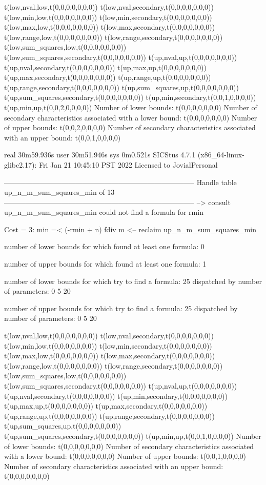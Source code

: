 t(low,nval,low,t(0,0,0,0,0,0,0))
t(low,nval,secondary,t(0,0,0,0,0,0,0))
t(low,min,low,t(0,0,0,0,0,0,0))
t(low,min,secondary,t(0,0,0,0,0,0,0))
t(low,max,low,t(0,0,0,0,0,0,0))
t(low,max,secondary,t(0,0,0,0,0,0,0))
t(low,range,low,t(0,0,0,0,0,0,0))
t(low,range,secondary,t(0,0,0,0,0,0,0))
t(low,sum_squares,low,t(0,0,0,0,0,0,0))
t(low,sum_squares,secondary,t(0,0,0,0,0,0,0))
t(up,nval,up,t(0,0,0,0,0,0,0))
t(up,nval,secondary,t(0,0,0,0,0,0,0))
t(up,max,up,t(0,0,0,0,0,0,0))
t(up,max,secondary,t(0,0,0,0,0,0,0))
t(up,range,up,t(0,0,0,0,0,0,0))
t(up,range,secondary,t(0,0,0,0,0,0,0))
t(up,sum_squares,up,t(0,0,0,0,0,0,0))
t(up,sum_squares,secondary,t(0,0,0,0,0,0,0))
t(up,min,secondary,t(0,0,1,0,0,0,0))
t(up,min,up,t(0,0,2,0,0,0,0))
Number of lower bounds:                                             t(0,0,0,0,0,0,0)
Number of secondary characteristics associated with a lower bound:  t(0,0,0,0,0,0,0)
Number of upper bounds:                                             t(0,0,2,0,0,0,0)
Number of secondary characteristics associated with an upper bound: t(0,0,1,0,0,0,0)

real	30m59.936s
user	30m51.946s
sys	0m0.521s
SICStus 4.7.1 (x86_64-linux-glibc2.17): Fri Jan 21 10:45:10 PST 2022
Licensed to JovialPersonal


--------------------------------------------------------------------------------
Handle table up_n_m_sum_squares_min of 13
--------------------------------------------------------------------------------
--> consult up_n_m_sum_squares_min
could not find a formula for rmin

Cost =  3:  min =< (-rmin + n) fdiv m
<-- reclaim up_n_m_sum_squares_min

number of lower bounds for which found at least one formula: 0

number of upper bounds for which found at least one formula: 1

number of lower bounds for which try to find a formula: 25
dispatched by number of parameters: 0  5  20

number of upper bounds for which try to find a formula: 25
dispatched by number of parameters: 0  5  20

t(low,nval,low,t(0,0,0,0,0,0,0))
t(low,nval,secondary,t(0,0,0,0,0,0,0))
t(low,min,low,t(0,0,0,0,0,0,0))
t(low,min,secondary,t(0,0,0,0,0,0,0))
t(low,max,low,t(0,0,0,0,0,0,0))
t(low,max,secondary,t(0,0,0,0,0,0,0))
t(low,range,low,t(0,0,0,0,0,0,0))
t(low,range,secondary,t(0,0,0,0,0,0,0))
t(low,sum_squares,low,t(0,0,0,0,0,0,0))
t(low,sum_squares,secondary,t(0,0,0,0,0,0,0))
t(up,nval,up,t(0,0,0,0,0,0,0))
t(up,nval,secondary,t(0,0,0,0,0,0,0))
t(up,min,secondary,t(0,0,0,0,0,0,0))
t(up,max,up,t(0,0,0,0,0,0,0))
t(up,max,secondary,t(0,0,0,0,0,0,0))
t(up,range,up,t(0,0,0,0,0,0,0))
t(up,range,secondary,t(0,0,0,0,0,0,0))
t(up,sum_squares,up,t(0,0,0,0,0,0,0))
t(up,sum_squares,secondary,t(0,0,0,0,0,0,0))
t(up,min,up,t(0,0,1,0,0,0,0))
Number of lower bounds:                                             t(0,0,0,0,0,0,0)
Number of secondary characteristics associated with a lower bound:  t(0,0,0,0,0,0,0)
Number of upper bounds:                                             t(0,0,1,0,0,0,0)
Number of secondary characteristics associated with an upper bound: t(0,0,0,0,0,0,0)

